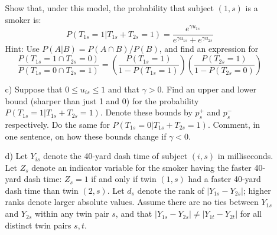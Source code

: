 \documentclass{article}
\begin{document}
\begin{itemize}
\begin{itemize}
          Show that, under this model, the probability
          that subject $(1,s)$ is a smoker is:
          \begin{equation}
            P(T_{1s} = 1| T_{1s} + T_{2s} = 1) 
            = \frac{e^{\gamma u_{1s}}}{e^{\gamma u_{1s}} + e^{\gamma u_{2s}}}
            \label{aprobques}
          \end{equation}
          Hint: Use $P(A | B) = P(A\cap B)/P(B)$, and find an expression for
          $$
            \frac{P(T_{1s} = 1 \cap T_{2s} = 0)}{P(T_{1s} = 0 \cap T_{2s} = 1)} = 
            \left(\frac{P(T_{1s} = 1)}{1 - P(T_{1s} = 1)}\right)
            \left(\frac{P(T_{2s} = 1)}{1 - P(T_{2s} = 0)}\right)
          $$
        \item[c)]
          Suppose that $0 \leq u_{is} \leq 1$ and that $\gamma > 0$.
          Find an upper and lower bound (sharper than just 1 and 0) for the probability
          $P(T_{1s} = 1| T_{1s} + T_{2s} = 1).$
          Denote these bounds by $p^+_s$ and $p^-_s$ respectively.
          Do the same for $P(T_{1s} = 0| T_{1s} + T_{2s} = 1).$
          Comment, in one sentence, on how these bounds change if $\gamma < 0$.
        \item[d)]
          Let $Y_{is}$ denote the 40-yard dash time of subject $(i,s)$ in milliseconds.
          Let $Z_s$ denote an indicator variable for the smoker having the faster 40-yard dash time:
          $Z_s = 1$ if and only if twin $(1,s)$ had a faster 40-yard dash time than twin $(2,s)$.
          Let $d_s$ denote the rank of $|Y_{1s} - Y_{2s}|$; higher ranks denote larger absolute values.
          Assume there are no ties between $Y_{1s}$ and $Y_{2s}$ within any 
          twin pair $s$,
          and that $|Y_{1s} - Y_{2s}| \neq |Y_{1t} - Y_{2t}|$ for all distinct twin pairs $s,t$.
          

\end{itemize}
\end{itemize}
\end{document}
